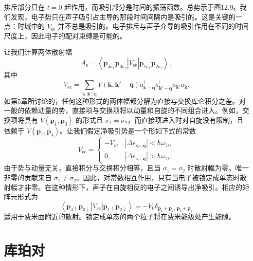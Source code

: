 排斥部分只在 $t=0$ 起作用，而吸引部分是时间的振荡函数。总势示于图12.9。我们发现，电子势只在声子吸引占主导的那段时间间隔内是吸引的。这是关键的一点：时域中的 $V_{\mathrm{ee}}$ 并不总是吸引的。电子排斥与声子介导的吸引作用在不同的时间尺度上，因此电子的配对束缚是可能的。

让我们计算两体散射幅
\begin{equation*}
A_{\mathrm{s}}=\left\langle\mathbf{p}_{4\sigma_{1}}\mathbf{p}_{3\sigma_{2}}\right|V_{\mathrm{ee}}\left|\mathbf{p}_{1\sigma_{1}}\mathbf{p}_{2\sigma_{2}}\right\rangle,\tag{12.39}
\end{equation*}
其中
\begin{equation*}
V_{\mathrm{ee}}=\sum_{\mathbf{k},\mathbf{k}',\mathbf{q}}V(\mathbf{k},\mathbf{k}'-\mathbf{q})a_{\mathbf{k}+\mathbf{q}}^{\dagger}a_{\mathbf{k}'-\mathbf{q}}^{\dagger}a_{\mathbf{k}'}a_{\mathbf{k}}.\tag{12.40}
\end{equation*}
如第5章所讨论的，任何这种形式的两体幅都分解为直接与交换库仑积分之差。对一般的依赖动量的势，直接项与交换项将以动量和自旋的不同组合进入。例如，交换项将具有 $V(\mathbf{p}_{1},\mathbf{p}_{3})$ 的形式且 $\sigma_{1}=\sigma_{2}$，而直接项进入时对自旋没有限制，且依赖于 $V(\mathbf{p}_{1},\mathbf{p}_{4})$。让我们假定净吸引势是一个形如下式的常数
\begin{equation*}
V_{\mathrm{ee}}=\begin{cases}-V_{o}, & \left|\Delta\epsilon_{\mathbf{k}_{\mathrm{F}},\mathbf{q}}\right|<\hbar\omega_{\mathrm{D}},\\ 0, & \left|\Delta\epsilon_{\mathbf{k}_{\mathrm{F}},\mathbf{q}}\right|>\hbar\omega_{\mathrm{D}}.\end{cases}\tag{12.41}
\end{equation*}
由于势与动量无关，直接积分与交换积分相等，且当 $\sigma_{1}=\sigma_{2}$ 时散射幅为零。唯一非零的贡献来自 $\sigma_{1}\neq\sigma_{2}$。因此，对常数相互作用，只有当电子被锁定成单态时散射幅才非零。在这种情形下，声子在自旋相反的电子之间诱导出净吸引。相应的矩阵元形式为
\begin{equation*}
\left\langle\mathbf{p}_{4\uparrow}\mathbf{p}_{3\downarrow}\right|V_{\mathrm{ee}}\left|\mathbf{p}_{1\uparrow}\mathbf{p}_{2\downarrow}\right\rangle=-V_{0}\delta_{\mathbf{p}_{1}+\mathbf{p}_{2},\,\mathbf{p}_{3}+\mathbf{p}_{4}}\tag{12.42}
\end{equation*}
适用于费米面附近的散射。锁定成单态的两个粒子将在费米能级处产生能隙。

\section{库珀对}

